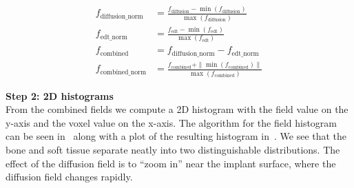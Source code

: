 %

\begin{equation}
    \label{eq:field-comb}
    \begin{split}
        f_{\text{diffusion\_norm}} &= \frac{f_{\text{diffusion}} - \min (f_{\text{diffusion}})}{\max (f_{\text{diffusion}})} \\
        f_{\text{edt\_norm}} &= \frac{f_{\text{edt}} - \min (f_{\text{edt}})}{\max (f_{\text{edt}})} \\
        f_{\text{combined}} &= f_{\text{diffusion\_norm}} - f_{\text{edt\_norm}} \\
        f_{\text{combined\_norm}} &= \frac{f_{\text{combined}} + \|\min (f_{\text{combined}})\|}{\max (f_{\text{combined}})}
    \end{split}
\end{equation}

\vspace{\baselineskip}
\noindent\textbf{Step 2: 2D histograms} \\
From the combined fields we compute a 2D histogram with the field value on the
y-axis and the voxel value on the x-axis. The algorithm for the field histogram
can be seen in~ along with a plot of the resulting
histogram in~. We see that the bone and soft tissue
separate neatly into two distinguishable distributions. The effect of the
diffusion field is to ``zoom in'' near the implant surface, where the diffusion
field changes rapidly.

